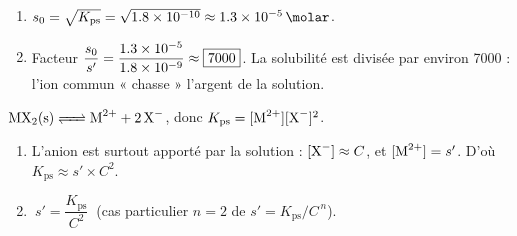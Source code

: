 \documentclass[11pt,a4paper]{article}
\newcommand{\Kps}{K_{\mathrm{ps}}}
\begin{document}
\begin{correction}
\begin{enumerate}[label=\alph*),leftmargin=2em,topsep=2pt,itemsep=2pt]
  \item $s_0=\sqrt{\Kps}=\sqrt{\num{1{,}8e-10}}\approx\qty{1{,}3e-5}{\molar}$.
  \item Facteur $\dfrac{s_0}{s'}=\dfrac{\num{1{,}3e-5}}{\num{1{,}8e-9}}\approx\boxed{7000}$. La
        solubilité est divisée par environ \num{7000} : l'ion commun « chasse » l'argent de la solution.
\end{enumerate}
\end{correction}

\begin{correction}
$\ce{MX2(s) <=> M^{2+} + 2 X-}$, donc $\Kps=[\ce{M^2+}][\ce{X-}]^{2}$.
\begin{enumerate}[label=\alph*),leftmargin=2em,topsep=2pt,itemsep=2pt]
  \item L'anion est surtout apporté par la solution : $[\ce{X-}]\approx C$, et $[\ce{M^2+}]=s'$. D'où
        $\Kps\approx s'\times C^{2}$.
  \item $\boxed{\ s'=\dfrac{\Kps}{C^{2}}\ }$ (cas particulier $n=2$ de $s'=\Kps/C^{\,n}$).
\end{enumerate}
\end{correction}
\end{document}
